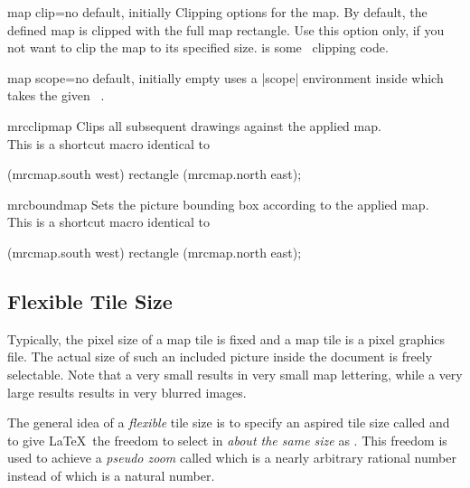 \begin{docMrcKey}{map clip}{=}{no default, initially }
  Clipping options for the map. By default, the defined map is
  clipped with the full map rectangle. Use this option only, if you not want to clip
  the map to its specified size.  is some \tikzname\ clipping code.
\end{docMrcKey}

\begin{docMrcKey}{map scope}{=}{no default, initially empty}
   uses a |scope| environment inside which takes
  the given \tikzname\ .
\end{docMrcKey}


\begin{docCommand}{mrcclipmap}{}
  Clips all subsequent drawings against the applied map.\\
  This is a shortcut macro identical to
  \begin{dispListing}
  \path[clip] (mrcmap.south west) rectangle (mrcmap.north east);
  \end{dispListing}
\end{docCommand}


\begin{docCommand}{mrcboundmap}{}
  Sets the picture bounding box according to the applied map.\\
  This is a shortcut macro identical to
  \begin{dispListing}
    (mrcmap.south west) rectangle (mrcmap.north east);
  \end{dispListing}
\end{docCommand}


\clearpage
\subsection{Flexible Tile Size}\label{sec:flexible_tile_size}

Typically, the pixel size of a map tile is fixed and a map tile is a
pixel graphics file. The actual size of such an included picture inside
the document is freely selectable. Note that a very small
 results in very small map lettering,
while a very large  results results in
very blurred images.

The general idea of a \emph{flexible} tile size is to specify an aspired
tile size called  and to give \LaTeX\
the freedom to select  in \emph{about the same size}
as \refKey{/mermap/flex tile size}.
This freedom is used to achieve a \emph{pseudo zoom} called
 which is a nearly arbitrary rational number instead
of \refKey{/mermap/supply/zoom} which is a natural number.

